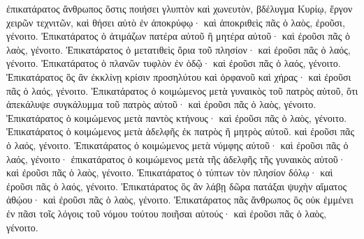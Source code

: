 {ἐπικατάρατος ἄνθρωπος ὅστις ποιήσει γλυπτὸν καὶ χωνευτὸν, βδέλυγμα Κυρίῳ, ἔργον χειρῶν τεχνιτῶν, καὶ θήσει αὐτὸ ἐν ἀποκρύφῳ· καὶ ἀποκριθεὶς πᾶς ὁ λαὸς, ἐροῦσι, γένοιτο.
Ἐπικατάρατος ὁ ἀτιμάζων πατέρα αὐτοῦ ἢ μητέρα αὐτοῦ· καὶ ἐροῦσι πᾶς ὁ λαὸς, γένοιτο.
Ἐπικατάρατος ὁ μετατιθεὶς ὅρια τοῦ πλησίον· καὶ ἐροῦσι πᾶς ὁ λαός, γένοιτο.
Ἐπικατάρατος ὁ πλανῶν τυφλὸν ἐν ὁδῷ· καὶ ἐροῦσι πᾶς ὁ λαός, γένοιτο.
Ἐπικατάρατος ὃς ἂν ἐκκλίνῃ κρίσιν προσηλύτου καὶ ὀρφανοῦ καὶ χήρας· καὶ ἐροῦσι πᾶς ὁ λαός, γένοιτο.
Ἐπικατάρατος ὁ κοιμώμενος μετὰ γυναικὸς τοῦ πατρὸς αὐτοῦ, ὅτι ἀπεκάλυψε συγκάλυμμα τοῦ πατρὸς αὐτοῦ· καὶ ἐροῦσι πᾶς ὁ λαὸς, γένοιτο.
Ἐπικατάρατος ὁ κοιμώμενος μετὰ παντὸς κτήνους· καὶ ἐροῦσι πᾶς ὁ λαὸς, γένοιτο.
Ἐπικατάρατος ὁ κοιμώμενος μετὰ ἀδελφῆς ἐκ πατρὸς ἢ μητρὸς αὐτοῦ. καὶ ἐροῦσι πᾶς ὁ λαός, γένοιτο.
Ἐπικατάρατος ὁ κοιμώμενος μετὰ νύμφης αὐτοῦ· καὶ ἐροῦσι πᾶς ὁ λαός, γένοιτο· ἐπικατάρατος ὁ κοιμώμενος μετὰ τῆς ἀδελφῆς τῆς γυναικὸς αὐτοῦ· καὶ ἐροῦσι πᾶς ὁ λαὸς, γένοιτο.
Ἐπικατάρατος ὁ τύπτων τὸν πλησίον δόλῳ· καὶ ἐροῦσι πᾶς ὁ λαός, γένοιτο.
Ἐπικατάρατος ὃς ἂν λάβῃ δῶρα πατάξαι ψυχὴν αἵματος ἀθῴου· καὶ ἐροῦσι πᾶς ὁ λαὸς, γένοιτο.
Ἐπικατάρατος πᾶς ἄνθρωπος ὃς οὐκ ἐμμένει ἐν πᾶσι τοῖς λόγοις τοῦ νόμου τούτου ποιῆσαι αὐτούς· καὶ ἐροῦσι πᾶς ὁ λαὸς, γένοιτο.

}
